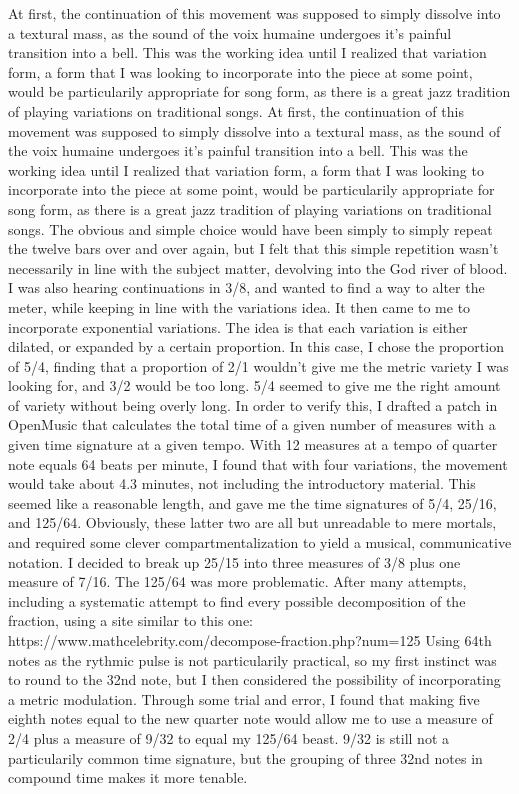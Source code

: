 \documentclass[12pt,twoside,maitrise]{dms}
\theoremstyle{definition}
\begin{document}
At first, the continuation of this movement was supposed to simply dissolve into a textural mass, as the sound of the voix humaine undergoes it's painful transition into a bell.
This was the working idea until I realized that variation form, a form that I was looking to incorporate into the piece at some point, would be particularily appropriate for song form, as there is a great jazz tradition of playing variations on traditional songs.
At first, the continuation of this movement was supposed to simply dissolve into a textural mass, as the sound of the voix humaine undergoes it's painful transition into a bell.
This was the working idea until I realized that variation form, a form that I was looking to incorporate into the piece at some point, would be particularily appropriate for song form, as there is a great jazz tradition of playing variations on traditional songs.
The obvious and simple choice would have been simply to simply repeat the twelve bars over and over again, but I felt that this simple repetition wasn't necessarily in line with the subject matter, devolving into the God river of blood.
I was also hearing continuations in 3/8, and wanted to find a way to alter the meter, while keeping in line with the variations idea.
It then came to me to incorporate exponential variations.
The idea is that each variation is either dilated, or expanded by a certain proportion.
In this case, I chose the proportion of 5/4, finding that a proportion of 2/1 wouldn't give me the metric variety I was looking for, and 3/2 would be too long.
5/4 seemed to give me the right amount of variety without being overly long.
In order to verify this, I drafted a patch in OpenMusic that calculates the total time of a given number of measures with a given time signature at a given tempo.
With 12 measures at a tempo of quarter note equals 64 beats per minute, I found that with four variations, the movement would take about 4.3 minutes, not including the introductory material.
This seemed like a reasonable length, and gave me the time signatures of 5/4, 25/16, and 125/64.
Obviously, these latter two are all but unreadable to mere mortals, and required some clever compartmentalization to yield a musical, communicative notation.
I decided to break up 25/15 into three measures of 3/8 plus one measure of 7/16.
The 125/64 was more problematic.
After many attempts, including a systematic attempt to find every possible decomposition of the fraction, using a site similar to this one: https://www.mathcelebrity.com/decompose-fraction.php?num=125%
Using 64th notes as the rythmic pulse is not particularily practical, so my first instinct was to round to the 32nd note, but I then considered the possibility of incorporating a metric modulation.
Through some trial and error, I found that making five eighth notes equal to the new quarter note would allow me to use a measure of 2/4 plus a measure of 9/32 to equal my 125/64 beast.
9/32 is still not a particularily common time signature, but the grouping of three 32nd notes in compound time makes it more tenable.
\end{document}
